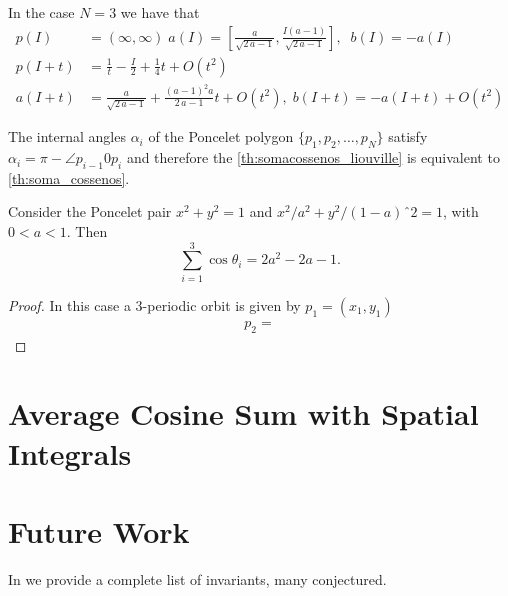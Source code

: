 \begin{example} In the case $N=3$ we have that
\begin{align*}
p(I)&=(\infty,\infty)\; a(I)=[{ {\frac {a}{\sqrt {2\,a-1}}}},     {\frac {I(a-1)}{\sqrt {2\,a-1}}}],\;\; b(I)=-a(I)\\
p(I+t)&=\frac{1}{t} -{\frac {I}{2}}+{\frac{1}{4}}t+O \left( {t}^{2} \right)  \\
a(I+t)&= { {\frac {a}{\sqrt {2\,a-1}}}}+{\frac { \left( a-1 \right) ^{2}a}{2\,
a-1}}t+O \left( {t}^{2} \right), \; b(I+t)=-a(I+t)+O(t^2)
%
\end{align*}
\end{example}
\begin{remark}
The internal angles $\alpha_i$ of the Poncelet polygon $\{p_1,p_2,\ldots, p_N\}$ satisfy
$\alpha_i=\pi-\angle p_{i-1}0p_i$ and therefore the \cref{th:somacossenos_liouville} is equivalent to \cref{th:soma_cossenos}.
\end{remark}

\begin{proposition} Consider the Poncelet pair $x^2+y^2=1$ and $x^2/a^2+y^2/(1-a)ˆ2=1$, with $0<a<1.$
Then \[\sum_{i=1}^3\cos\theta_i=2a^2-2a-1.\]
\end{proposition}

\begin{proof} In this case a 3-periodic orbit is given
by $p_1=(x_1,y_1)$
\begin{align*}
    p_2=
\end{align*}
 


\end{proof}
\section{Average Cosine Sum with Spatial Integrals}

\section{Future Work}

In \cite{reznik2021-fifty-invariants} we provide a complete list of invariants, many conjectured.
